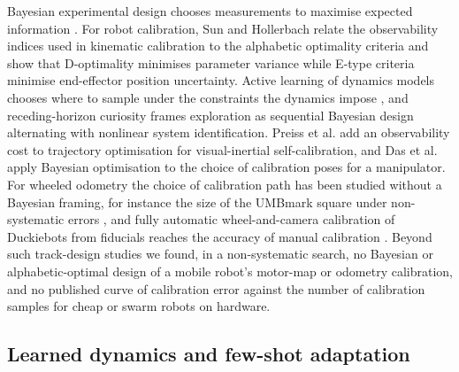 Bayesian experimental design chooses measurements to maximise expected
information \cite{chaloner1995design, rainforth2024design}. For robot
calibration, Sun and Hollerbach \cite{sun2008observability} relate the
observability indices used in kinematic calibration to the alphabetic
optimality criteria and show that D-optimality minimises parameter
variance while E-type criteria minimise end-effector position
uncertainty. Active
learning of dynamics models chooses where to sample under the
constraints the dynamics impose \cite{buissonfenet2020active}, and
receding-horizon curiosity \cite{schultheis2019curiosity} frames
exploration as sequential Bayesian design alternating with nonlinear
system identification. Preiss et al. \cite{preiss2017selfcalibration}
add an observability cost to trajectory optimisation for visual-inertial
self-calibration, and Das et al. \cite{das2024boed} apply Bayesian
optimisation to the choice of calibration poses for a manipulator. For
wheeled odometry the choice of calibration path has been studied without
a Bayesian framing, for instance the size of the UMBmark square under
non-systematic errors \cite{jung2011tracks}, and fully automatic
wheel-and-camera calibration of Duckiebots from fiducials reaches the
accuracy of manual calibration \cite{chaika2021duckiebot}. Beyond such track-design studies we found, in a
non-systematic search, no Bayesian or alphabetic-optimal design of a
mobile robot's motor-map or odometry calibration, and no published curve
of calibration error against the number of calibration samples for
cheap or swarm robots on hardware.

\subsection{Learned dynamics and few-shot
adaptation}

